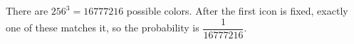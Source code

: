 There are $256^3=\boxed{16777216}$ possible colors. After the first icon is fixed, exactly one of these matches it, so the probability is $\boxed{\dfrac{1}{16777216}}$.
